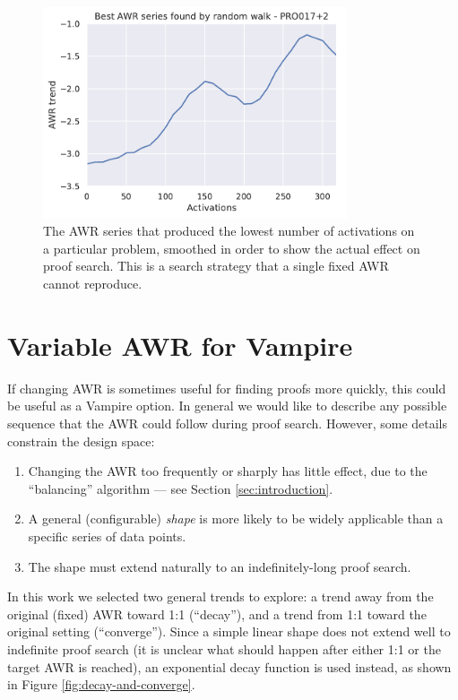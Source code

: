 \documentclass{llncs}
\begin{document}
\begin{figure}
	\centering
	\includegraphics[width=0.8\textwidth]{random-walk}
	\caption{The AWR series that produced the lowest number of activations on a particular problem, smoothed in order to show the actual effect on proof search. This is a search strategy that a single fixed AWR cannot reproduce.}
	\label{fig:random-walk}
\end{figure}

\section{Variable AWR for Vampire}
If changing AWR is sometimes useful for finding proofs more quickly, this could be useful as a Vampire option.
In general we would like to describe any possible sequence that the AWR could follow during proof search.
However, some details constrain the design space:
\begin{enumerate}
	\item Changing the AWR too frequently or sharply has little effect, due to the ``balancing'' algorithm --- see Section \ref{sec:introduction}.
	\item A general (configurable) \emph{shape} is more likely to be widely applicable than a specific series of data points.
	\item The shape must extend naturally to an indefinitely-long proof search.
\end{enumerate}

In this work we selected two general trends to explore: a trend away from the original (fixed) AWR toward 1:1 (``decay''), and a trend from 1:1 toward the original setting (``converge'').
Since a simple linear shape does not extend well to indefinite proof search (it is unclear what should happen after either 1:1 or the target AWR is reached), an exponential decay function is used instead, as shown in Figure \ref{fig:decay-and-converge}.
\end{document}
